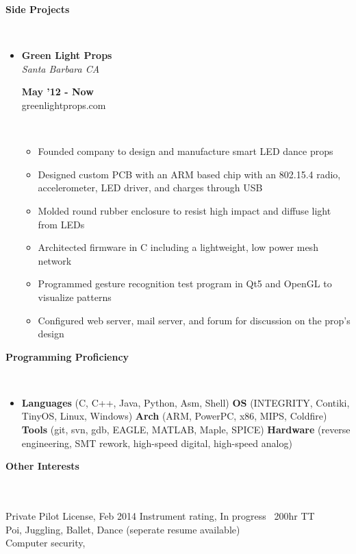 \documentclass[a4paper,11pt]{article}
\newcommand{\lsep}{-0.2cm}
\newcommand{\resheading}[1]{{\small \colorbox{mygrey}{\begin{minipage}{0.975\textwidth}{\textbf{#1 \vphantom{p\^{E}}}}\end{minipage}}}}
\newcommand{\workexp}[4]{
\begin{minipage}[t]{7cm}
\begin{flushleft}
\textbf{#1} \\
\indent \emph{#2}\\
\end{flushleft}
\end{minipage}
\hfill
\begin{minipage}[t]{7cm}
\begin{flushright}
\textbf{#3} \\
\indent #4 \\
\end{flushright}
\end{minipage}
}
\begin{document}

\resheading{\textbf{Side Projects}}\\[\lsep]

\begin{itemize}
\item \workexp{Green Light Props}{Santa Barbara CA}{May '12 - Now}{greenlightprops.com}
\\[-0.2cm]
	\begin{itemize}
	\item Founded company to design and manufacture smart LED dance props
	\item Designed custom PCB with an ARM based chip with an 802.15.4 radio, accelerometer, LED driver, and charges through USB
	\item Molded round rubber enclosure to resist high impact and diffuse light from LEDs
	\item Architected firmware in C including a lightweight, low power mesh network
	\item Programmed gesture recognition test program in Qt5 and OpenGL to visualize patterns
	\item Configured web server, mail server, and forum for discussion on the prop's design
	\end{itemize}
\end{itemize}



\resheading{\textbf{Programming Proficiency} }\\[\lsep]
\begin{itemize}
\item \noindent \textbf{Languages} (C, C++, Java, Python, Asm, Shell)  
\textbf{OS} (INTEGRITY, Contiki, TinyOS, Linux, Windows) 
\textbf{Arch} (ARM, PowerPC, x86, MIPS, Coldfire) 
\textbf{Tools} (git, svn, gdb, EAGLE, MATLAB, Maple, SPICE) 
\textbf{Hardware} (reverse engineering, SMT rework, high-speed digital, high-speed analog)
\end{itemize} 



\resheading{\textbf{Other Interests} }\\[\lsep]
\\[0.2cm]
\indent Private Pilot License, Feb 2014 \indent Instrument rating, In progress \indent ~200hr TT\\
\indent Poi, Juggling, Ballet, Dance (seperate resume available) \\
\indent Computer security, 
\end{document}
